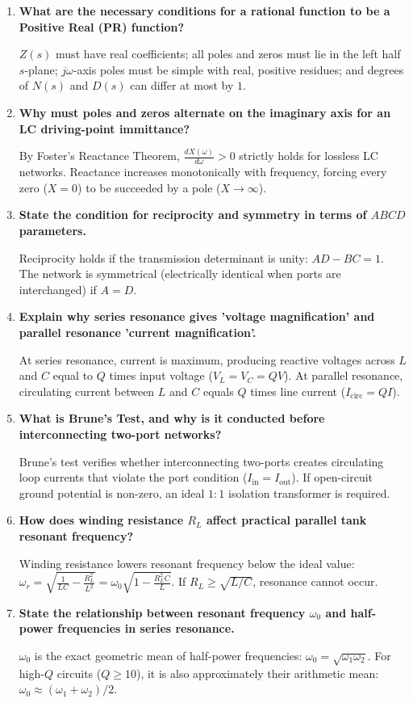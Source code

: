 \documentclass[12pt,a4paper]{article}
\newcommand{\Q}[1]{\textbf{#1}\par\noindent\ignorespaces}
\begin{document}
\begin{tcolorbox}[exambox, title={\textbf{Frequently Asked / Viva Questions (Part 1)}}]
\begin{enumerate}[topsep=0pt, label=\textbf{Q\arabic*.}, itemsep=3.5pt]
  \item \Q{What are the necessary conditions for a rational function to be a Positive Real (PR) function?}
  $Z(s)$ must have real coefficients; all poles and zeros must lie in the left half $s$-plane; $j\omega$-axis poles must be simple with real, positive residues; and degrees of $N(s)$ and $D(s)$ can differ at most by $1$.

  \item \Q{Why must poles and zeros alternate on the imaginary axis for an LC driving-point immittance?}
  By Foster's Reactance Theorem, $\frac{dX(\omega)}{d\omega} > 0$ strictly holds for lossless LC networks. Reactance increases monotonically with frequency, forcing every zero ($X=0$) to be succeeded by a pole ($X \to \infty$).

  \item \Q{State the condition for reciprocity and symmetry in terms of $ABCD$ parameters.}
  Reciprocity holds if the transmission determinant is unity: $AD - BC = 1$. The network is symmetrical (electrically identical when ports are interchanged) if $A = D$.

  \item \Q{Explain why series resonance gives 'voltage magnification' and parallel resonance 'current magnification'.}
  At series resonance, current is maximum, producing reactive voltages across $L$ and $C$ equal to $Q$ times input voltage ($V_L = V_C = Q V$). At parallel resonance, circulating current between $L$ and $C$ equals $Q$ times line current ($I_{\text{circ}} = Q I$).

  \item \Q{What is Brune's Test, and why is it conducted before interconnecting two-port networks?}
  Brune's test verifies whether interconnecting two-ports creates circulating loop currents that violate the port condition ($I_{\text{in}} = I_{\text{out}}$). If open-circuit ground potential is non-zero, an ideal $1:1$ isolation transformer is required.

  \item \Q{How does winding resistance $R_L$ affect practical parallel tank resonant frequency?}
  Winding resistance lowers resonant frequency below the ideal value: $\omega_r = \sqrt{\frac{1}{LC} - \frac{R_L^2}{L^2}} = \omega_0\sqrt{1 - \frac{R_L^2 C}{L}}$. If $R_L \ge \sqrt{L/C}$, resonance cannot occur.

  \item \Q{State the relationship between resonant frequency $\omega_0$ and half-power frequencies in series resonance.}
  $\omega_0$ is the exact geometric mean of half-power frequencies: $\omega_0 = \sqrt{\omega_1 \omega_2}$. For high-$Q$ circuits ($Q \ge 10$), it is also approximately their arithmetic mean: $\omega_0 \approx (\omega_1 + \omega_2)/2$.
\end{enumerate}
\end{tcolorbox}
\end{document}
